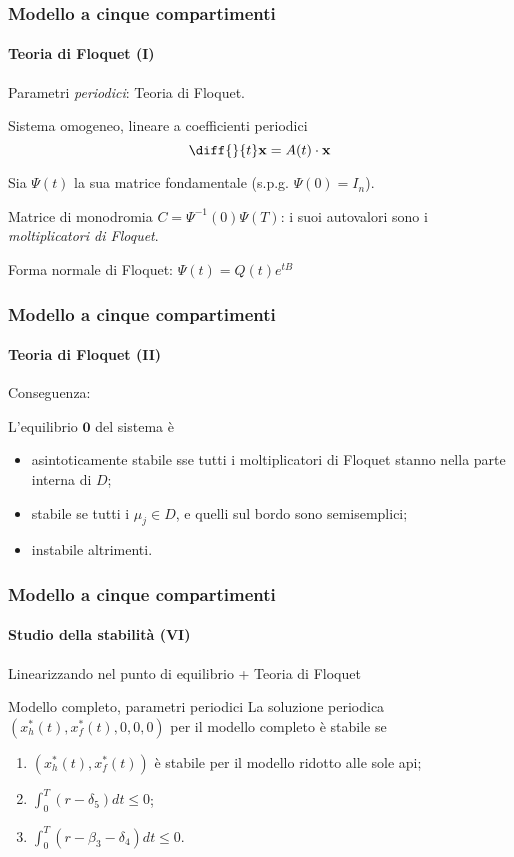\documentclass[]{beamer} %
\begin{document}
\begin{frame}
    \frametitle{Modello a cinque compartimenti}
    \framesubtitle{Teoria di Floquet (I)}

    Parametri \emph{periodici}: Teoria di Floquet.

    \vspace{1em}
    Sistema omogeneo, lineare a coefficienti periodici
    $$\diff{}{t} \mathbf{x} = A(t) \cdot \mathbf{x}$$

    \pause
    Sia $\Psi (t)$ la sua matrice fondamentale
    \pause (s.p.g. $\Psi (0) = I_n$).

    \pause
    \vspace{1em}
    Matrice di monodromia $C= \Psi^{-1} (0) \Psi (T)$:
    \pause
    i suoi autovalori sono i \emph{moltiplicatori di Floquet}.

    \pause
    \vspace{1em}
    Forma normale di Floquet: $\Psi (t) = Q(t) e^{tB}$
\end{frame}

\begin{frame}
    \frametitle{Modello a cinque compartimenti}
    \framesubtitle{Teoria di Floquet (II)}

    Conseguenza:

    L'equilibrio $\mathbf{0}$ del sistema è
    \begin{itemize}
        \item \pause asintoticamente stabile sse tutti i moltiplicatori di Floquet stanno nella
        parte interna di $D$;
        \item \pause stabile se tutti i $\mu_j \in D$, e quelli sul bordo sono semisemplici;
        \item \pause instabile altrimenti.
    \end{itemize}
\end{frame}

\begin{frame}
    \frametitle{Modello a cinque compartimenti}
    \framesubtitle{Studio della stabilità (VI)}

    Linearizzando nel punto di equilibrio + Teoria di Floquet

    \begin{exampleblock}{Modello completo, parametri periodici}
        La soluzione periodica $\left( x_h^*(t), x_f^*(t), 0, 0, 0 \right)$
        \pause per il modello completo è stabile se
        \begin{enumerate}
            \item \pause $\left( x_h^*(t), x_f^*(t) \right)$ è stabile per il modello ridotto alle sole api;
            \item \pause $\int_0^T (r - \delta_5) dt \leq 0$;
            \item \pause $\int_0^T (r -\beta_3 - \delta_4) dt \leq 0$.
        \end{enumerate}
    \end{exampleblock}
\end{frame}
\end{document}
